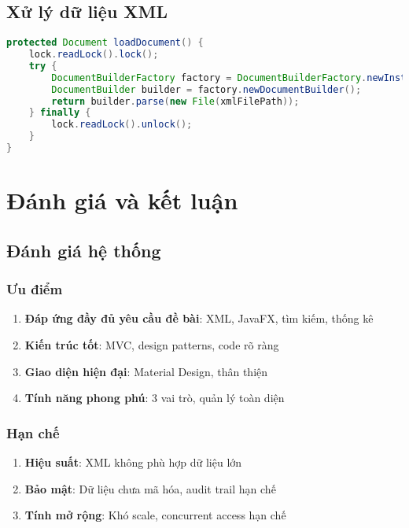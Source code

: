 \documentclass[12pt,a4paper]{article}
\begin{document}
\subsection{Xử lý dữ liệu XML}

\begin{lstlisting}[language=Java, caption=DOM Parser]
protected Document loadDocument() {
    lock.readLock().lock();
    try {
        DocumentBuilderFactory factory = DocumentBuilderFactory.newInstance();
        DocumentBuilder builder = factory.newDocumentBuilder();
        return builder.parse(new File(xmlFilePath));
    } finally {
        lock.readLock().unlock();
    }
}
\end{lstlisting}

\section{Đánh giá và kết luận}

\subsection{Đánh giá hệ thống}

\subsubsection{Ưu điểm}

\begin{enumerate}
    \item \textbf{Đáp ứng đầy đủ yêu cầu đề bài}: XML, JavaFX, tìm kiếm, thống kê
    \item \textbf{Kiến trúc tốt}: MVC, design patterns, code rõ ràng
    \item \textbf{Giao diện hiện đại}: Material Design, thân thiện
    \item \textbf{Tính năng phong phú}: 3 vai trò, quản lý toàn diện
\end{enumerate}

\subsubsection{Hạn chế}

\begin{enumerate}
    \item \textbf{Hiệu suất}: XML không phù hợp dữ liệu lớn
    \item \textbf{Bảo mật}: Dữ liệu chưa mã hóa, audit trail hạn chế
    \item \textbf{Tính mở rộng}: Khó scale, concurrent access hạn chế
\end{enumerate}
\end{document}
